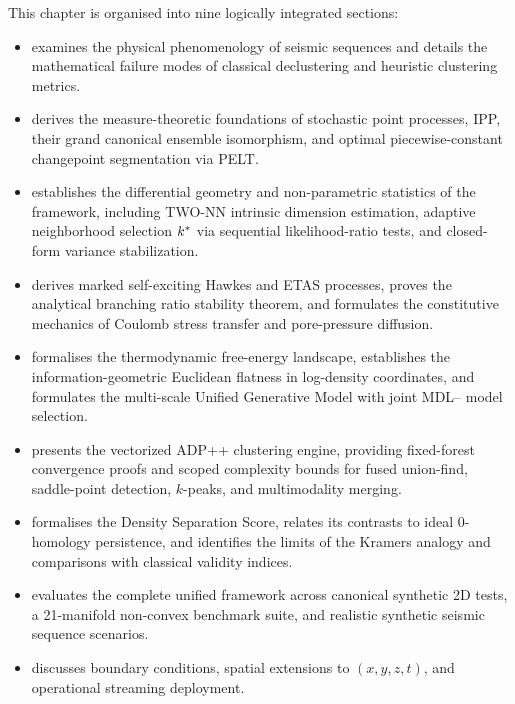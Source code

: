 This chapter is organised into nine logically integrated sections:
\begin{itemize}[noitemsep,topsep=3pt]
  \item {} examines the
    physical phenomenology of seismic sequences and details the
    mathematical failure modes of classical declustering and
    heuristic clustering metrics.
  \item {} derives the
    measure-theoretic foundations of stochastic point processes,
    \ac{IPP}, their grand canonical ensemble isomorphism, and optimal
    piecewise-constant changepoint segmentation via \ac{PELT}.
  \item {} establishes the differential
    geometry and non-parametric statistics of the \pak{} framework,
    including \ac{TWO-NN} intrinsic dimension estimation, adaptive
    neighborhood selection $k^{*}$ via sequential likelihood-ratio
    tests, and closed-form variance stabilization.
  \item {} derives marked
    self-exciting Hawkes and \ac{ETAS} processes, proves the
    analytical branching ratio stability theorem, and formulates the
    constitutive mechanics of Coulomb stress transfer and
    pore-pressure diffusion.
  \item {} formalises the
    thermodynamic free-energy landscape, establishes the
    information-geometric Euclidean flatness in log-density
    coordinates, and formulates the multi-scale Unified Generative
    Model with joint \ac{MDL}--\pak{} model selection.
  \item {} presents the
    vectorized \textsc{ADP++} clustering engine, providing fixed-forest
    convergence proofs and scoped complexity bounds for fused
    union-find, saddle-point detection, $k$-peaks, and multimodality merging.
  \item {} formalises the \pak{}
    Density Separation Score, relates its contrasts to ideal 0-homology
    persistence, and identifies the limits of the Kramers analogy and
    comparisons with classical validity indices.
  \item {} evaluates the
    complete unified framework across canonical synthetic 2D tests,
    a 21-manifold non-convex benchmark suite, and realistic
    synthetic seismic sequence scenarios.
  \item {} discusses boundary
    conditions, spatial extensions to $(x,y,z,t)$, and operational
    streaming deployment.
\end{itemize}

